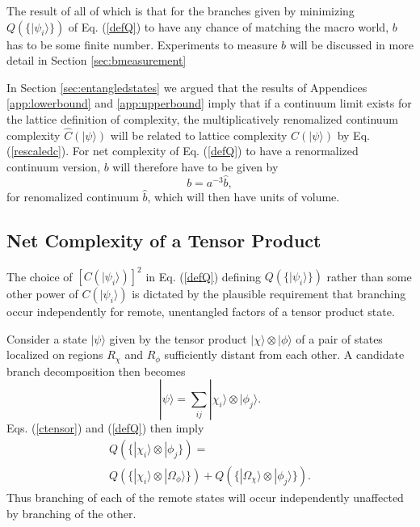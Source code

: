 \documentclass[12pt,amsmath,amssymb,onecolumn]{revtex4-2}
\begin{document}
The result of all of which is that for the branches given by minimizing $Q( \{|\psi_i \rangle \})$
of Eq. (\ref{defQ}) to 
have any chance of matching the macro world, $b$ has to be some finite
number.    Experiments to measure $b$
will be discussed in more detail in
Section \ref{sec:bmeasurement}

In Section \ref{sec:entangledstates} we argued that
the results of Appendices \ref{app:lowerbound} and \ref{app:upperbound} imply
that if a continuum limit exists for the lattice definition of complexity,
the multiplicatively renomalized continuum complexity  $\hat{C}( |\psi \rangle )$
will be related to lattice complexity $C( |\psi \rangle )$
by Eq. (\ref{rescaledc}). 
For net complexity of Eq. (\ref{defQ}) to have a renormalized continuum
version,  $b$ will therefore have to be given by
\begin{equation}
  \label{rescaledb}
  b = a^{-3} \hat{b},
\end{equation}
for renomalized continuum $\hat{b}$, which will then have units of volume.


\subsection{\label{subsec:remote} Net Complexity of a Tensor Product}


The choice of $[C( |\psi_i \rangle )]^2$ in Eq. (\ref{defQ}) defining
$Q(\{|\psi_i \rangle \})$ rather than some other power of
$C( |\psi_i \rangle )$ is dictated by the plausible requirement
that branching occur independently for remote,
unentangled factors of a tensor product state.

Consider a state $|\psi \rangle $ given by the tensor product
$|\chi \rangle  \otimes |\phi \rangle $
of a pair of states
localized on regions $R_{\chi}$ and $R_{\phi}$ sufficiently distant from each other.
A candidate branch decomposition then becomes
\begin{equation}
\label{productbranches}
|\psi \rangle  = \sum_{ij} |\chi_i \rangle  \otimes |\phi_j \rangle .
\end{equation}
Eqs. (\ref{ctensor}) and (\ref{defQ}) then imply
\begin{multline}
\label{productQ}
Q( \{|\chi_i \rangle  \otimes |\phi_j\}) = \\
Q( \{|\chi_i \rangle  \otimes |\Omega_\phi \rangle \}) + Q( \{|\Omega_\chi \rangle  \otimes |\phi_j \rangle \}).
\end{multline}
Thus branching of each of the remote states will occur independently unaffected
by branching of the other.
\end{document}
